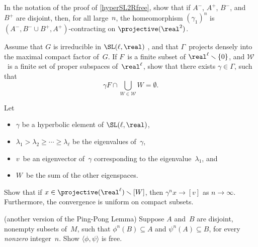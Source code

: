 \begin{exercises}
\item \label{hypercontracts}
 In the notation of the proof of \cref{hyperSL2Rfree},
show that if $A^-$, $A^+$, $B^-$, and~$B^+$ are disjoint,
then, for all large~$n$, the homeomorphism $(\gamma_1)^n$
is $(A^-, B^- \cup B^+, A^+)$-contracting on
$\projective(\real^2)$.

\item \label{gammavnotinW}
 Assume that $G$ is irreducible in $\SL(\ell,\real)$
, and that $\Gamma$~projects densely
into the maximal compact factor of~$G$. If $F$~is a finite
subset of $\real^\ell \smallsetminus \{0\}$, and
$\mathcal{W}$~is a finite set of proper subspaces
of~$\real^\ell$, show that there exists $\gamma \in
\Gamma$, such that 
 $$ \gamma F \cap \bigcup_{W \in \mathcal{W}} W =
\emptyset .$$

\goodbreak %

\item \label{SimpleEig->Contract}
 Let 
 \noprelistbreak
 \begin{itemize}
 \item $\gamma$ be a hyperbolic element of
$\SL(\ell,\real)$, 
\item  $\lambda_1 > \lambda_2
\ge \cdots \ge \lambda_\ell$ be the eigenvalues of~$\gamma$,
 \item $v$~be an eigenvector of~$\gamma$ corresponding to
the eigenvalue~$\lambda_1$, and 
 \item $W$~be the sum of the other eigenspaces. 
 \end{itemize}
 Show that if $x \in \projective(\real^\ell)
\smallsetminus [W]$, then $\gamma^n x \to [v]$ as $n \to
\infty$. Furthermore, the convergence is uniform on
compact subsets.

\item \label{PingPongABonly}
(another version of the Ping-Pong Lemma)
Suppose $A$ and~$B$ are disjoint, nonempty subsets of~$M$, such that $\phi^n(B) \subseteq A$ and $\psi^n(A) \subseteq B$, for every \emph{nonzero} integer~$n$.
Show $\langle \phi, \psi \rangle$ is free.


\end{exercises}
